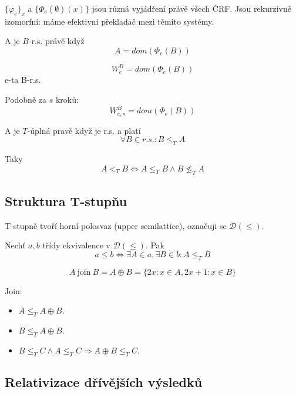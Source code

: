\begin{note}
	$\{ \varphi_e \}_x$ a $\{ \Phi_e(\emptyset)(x) \}$ jsou různá vyjádření právě všech ČRF.
	Jsou rekurzivně izomorfní: máme efektivní překladač mezi těmito systémy.
\end{note}

\begin{definition}
	A je $B$-r.s. právě když
	\[ A = dom(\Phi_e(B)) \]
\end{definition}

\begin{notation}
	\[ W^B_e = dom(\Phi_e(B)) \]
	e-ta B-r.s.

	Podobně za $s$ kroků:
	\[ W^B_{e, s} = dom(\Phi_e(B)) \]
\end{notation}

\begin{definition}[T-úplnost]
	A je $T$-úplná pravě když je r.s. a platí
	\[ \forall B \in r.s.: B \leq_T A \]

	Taky
	\[ A <_T B \iff A \leq_T B \land B \nleq_T A \]
\end{definition}

\subsection{Struktura T-stupňu}

T-stupně tvoří horní polosvaz (upper semilattice), označuji se $\mathcal{D}(\leq)$.
\begin{definition}
	Nechť $a, b$ třídy ekvivalence v $\mathcal{D}(\leq)$.
	Pak
	\[ a \leq b \iff \exists A \in a, \exists B \in b: A \leq_T B \]
\end{definition}

\begin{definition}[Join]
	\[ A \ \text{join}\ B = A \oplus B = \{ 2x: x \in A, 2x + 1: x \in B \} \]
\end{definition}

\begin{properties}
	Join:
	\begin{itemize}
		\item $A \leq_T A \oplus B$.
		\item $B \leq_T A \oplus B$.
		\item $B \leq_T C \land A \leq_T C \Rightarrow A \oplus B \leq_T C$.
	\end{itemize}
\end{properties}

\subsection{Relativizace dřívějších výsledků}

